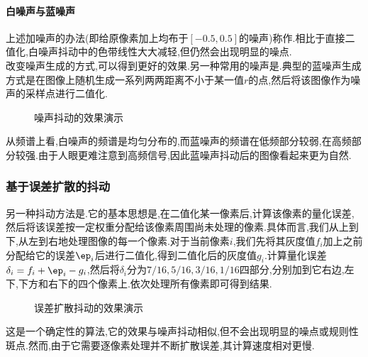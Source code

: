 \documentclass{ctexart}
\begin{document}
\paragraph{白噪声与蓝噪声}
上述加噪声的办法(即给原像素加上均布于$[-0.5,0.5]$的噪声)称作.相比于直接二值化,白噪声抖动中的色带线性大大减轻,但仍然会出现明显的噪点.\\
\indent 改变噪声生成的方式,可以得到更好的效果.另一种常用的噪声是.典型的蓝噪声生成方式是在图像上随机生成一系列两两距离不小于某一值$r$的点,然后将该图像作为噪声的采样点进行二值化.
\begin{figure}[H]
    \centering{}\quad\quad
    \quad\quad
    \caption{噪声抖动的效果演示}
\end{figure}
从频谱上看,白噪声的频谱是均匀分布的,而蓝噪声的频谱在低频部分较弱,在高频部分较强.由于人眼更难注意到高频信号,因此蓝噪声抖动后的图像看起来更为自然.
\subsubsection{基于误差扩散的抖动}
另一种抖动方法是.它的基本思想是,在二值化某一像素后,计算该像素的量化误差,然后将该误差按一定权重分配给该像素周围尚未处理的像素.具体而言,我们从上到下,从左到右地处理图像的每一个像素.对于当前像素$i$,我们先将其灰度值$f_i$加上之前分配给它的误差$\ep_i$后进行二值化,得到二值化后的灰度值$g_i$.计算量化误差$\delta_i=f_i+\ep_i-g_i$,然后将$\delta_i$分为$7/16,5/16,3/16,1/16$四部分,分别加到它右边,左下,下方和右下的四个像素上.依次处理所有像素即可得到结果.
\begin{figure}[H]
    \centering{}\quad\quad
    \caption{误差扩散抖动的效果演示}
\end{figure}
这是一个确定性的算法,它的效果与噪声抖动相似,但不会出现明显的噪点或规则性斑点.然而,由于它需要逐像素处理并不断扩散误差,其计算速度相对更慢.
\end{document}
